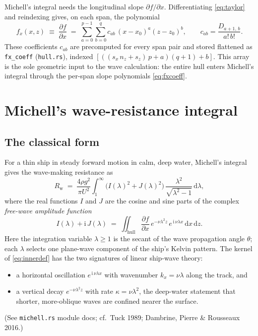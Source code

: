\documentclass[11pt]{article}
\newcommand{\ii}{\mathrm{i}}
\newcommand{\dd}{\,\mathrm{d}}
\newcommand{\Rw}{R_{\mathrm{w}}}
\begin{document}
Michell's integral needs the longitudinal slope $\partial f/\partial x$.
Differentiating \eqref{eq:taylor} and reindexing gives, on each span, the
polynomial
\begin{equation}
  \boxed{\;
  f_x(x, z) \;\equiv\; \frac{\partial f}{\partial x}
    \;=\; \sum_{a=0}^{p-1}\sum_{b=0}^{q}
      c_{ab}\,(x - x_0)^{a}(z - z_0)^{b},
  \qquad
  c_{ab} = \frac{D_{a+1,\,b}}{a!\,b!}. \;}
  \label{eq:fxcoeff}
\end{equation}
These coefficients $c_{ab}$ are precomputed for every span pair and stored
flattened as \texttt{fx\_coeff} (\texttt{hull.rs}), indexed
$[((s_x\, n_z + s_z)\,p + a)(q+1) + b]$. This array is the sole geometric input
to the wave calculation: the entire hull enters Michell's integral through the
per-span slope polynomials \eqref{eq:fxcoeff}.

\section{Michell's wave-resistance integral}
\label{sec:michell}

\subsection{The classical form}

For a thin ship in steady forward motion in calm, deep water, Michell's integral
gives the wave-making resistance as
\begin{equation}
  \Rw \;=\; \frac{4\rho g^{2}}{\pi U^{2}}
    \int_{1}^{\infty} \bigl(I(\lambda)^{2} + J(\lambda)^{2}\bigr)\,
      \frac{\lambda^{2}}{\sqrt{\lambda^{2}-1}}\dd\lambda,
  \label{eq:michell-lambda}
\end{equation}
where the real functions $I$ and $J$ are the cosine and sine parts of the
complex \emph{free-wave amplitude function}
\begin{equation}
  I(\lambda) + \ii\,J(\lambda)
    \;=\; \iint_{\text{hull}}
      \frac{\partial f}{\partial x}\,
      e^{-\nu\lambda^{2} z}\,
      e^{\,\ii\,\nu\lambda x}
      \dd x \dd z.
  \label{eq:innerdef}
\end{equation}
Here the integration variable $\lambda \ge 1$ is the secant of the wave
propagation angle $\theta$; each $\lambda$ selects one plane-wave component of
the ship's Kelvin pattern. The kernel of \eqref{eq:innerdef} has the two
signatures of linear ship-wave theory:
\begin{itemize}
  \item a horizontal oscillation $e^{\,\ii\,\nu\lambda x}$ with wavenumber
        $k_x = \nu\lambda$ along the track, and
  \item a vertical decay $e^{-\nu\lambda^{2} z}$ with rate
        $\kappa = \nu\lambda^{2}$, the deep-water statement that shorter,
        more-oblique waves are confined nearer the surface.
\end{itemize}
(See \texttt{michell.rs} module docs; cf.\ Tuck 1989; Dambrine, Pierre \&
Rousseaux 2016.)
\end{document}
